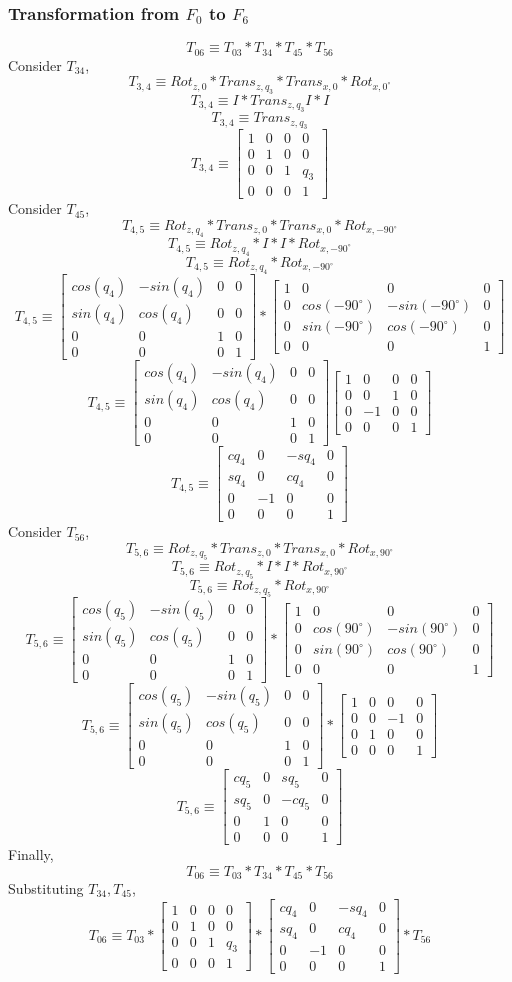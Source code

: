 \documentclass[12pt]{article}
\newcommand{\rx}[1]{\begin{bmatrix} 1 & 0 & 0 & 0 \\ 0 & cos(#1) & -sin(#1) & 0 \\ 0 & sin(#1) & cos(#1) & 0 \\ 0 & 0 & 0 & 1 \end{bmatrix}}
\newcommand{\rz}[1]{\begin{bmatrix} cos(#1) & -sin(#1) & 0 & 0 \\ sin(#1) & cos(#1) & 0 & 0 \\ 0 & 0 & 1 & 0 \\ 0 & 0 & 0 & 1 \end{bmatrix}}
\newcommand{\trans}[3]{\begin{bmatrix} 1 & 0 & 0 & #1 \\ 0 & 1 & 0 & #2 \\ 0 & 0 & 1 & #3 \\ 0 & 0 & 0 & 1 \end{bmatrix}}
\begin{document}
\subsubsection*{Transformation from $F_0$ to $F_6$}
\[
  T_{06} \equiv
  T_{03}
  * T_{34}
  * T_{45}
  * T_{56}
\]
Consider $T_{34}$,
\[
  T_{3,4} \equiv Rot_{z, 0} * Trans_{z, q_3} * Trans_{x, 0} * Rot_{x, 0^{\circ}}
\]
\[
  T_{3,4} \equiv I * Trans_{z, q_3} I * I
\]
\[
  T_{3,4} \equiv Trans_{z, q_3}
\]
\[
  T_{3,4} \equiv \trans{0}{0}{q_3}
\]
Consider $T_{45}$,
\[
  T_{4,5} \equiv Rot_{z, q_4} * Trans_{z, 0} * Trans_{x, 0} * Rot_{x, -90^{\circ}}
\]
\[
  T_{4,5} \equiv Rot_{z, q_4} * I * I * Rot_{x, -90^{\circ}}
\]
\[
  T_{4,5} \equiv Rot_{z, q_4} * Rot_{x, -90^{\circ}}
\]
\[
  T_{4,5} \equiv \rz{q_4} * \rx{-90^{\circ}}
\]
\[
  T_{4,5} \equiv \rz{q_4}
  \begin{bmatrix} 1 & 0 & 0 & 0 \\ 0 & 0 & 1 & 0 \\ 0 & -1 & 0 & 0 \\ 0 & 0 & 0 & 1 \end{bmatrix}
\]
\[
  T_{4,5} \equiv
  \begin{bmatrix} cq_4 & 0 & -sq_4 & 0 \\ sq_4 & 0 & cq_4 & 0 \\ 0 & -1 & 0 & 0 \\ 0 & 0 & 0 & 1 \end{bmatrix}
\]
Consider $T_{56}$,
\[
  T_{5,6} \equiv Rot_{z, q_5} * Trans_{z, 0} * Trans_{x, 0} * Rot_{x, 90^{\circ}}
\]
\[
  T_{5,6} \equiv Rot_{z, q_5} * I * I * Rot_{x, 90^{\circ}}
\]
\[
  T_{5,6} \equiv Rot_{z, q_5} * Rot_{x, 90^{\circ}}
\]
\[
  T_{5,6} \equiv \rz{q_5} * \rx{90^{\circ}}
\]
\[
  T_{5,6} \equiv \rz{q_5} *
  \begin{bmatrix} 1 & 0 & 0 & 0 \\ 0 & 0 & -1 & 0 \\ 0 & 1 & 0 & 0 \\ 0 & 0 & 0 & 1 \end{bmatrix}
\]
\[
  T_{5,6} \equiv
  \begin{bmatrix} cq_5 & 0 & sq_5 & 0 \\ sq_5 & 0 & -cq_5 & 0 \\ 0 & 1 & 0 & 0 \\ 0 & 0 & 0 & 1 \end{bmatrix}
\]
Finally,
\[
  T_{06} \equiv
  T_{03}
  * T_{34}
  * T_{45}
  * T_{56}
\]
Substituting $T_{34}, T_{45}$,
\[
  T_{06} \equiv
  T_{03}
  * \trans{0}{0}{q_3}
  * \begin{bmatrix} cq_4 & 0 & -sq_4 & 0 \\ sq_4 & 0 & cq_4 & 0 \\ 0 & -1 & 0 & 0 \\ 0 & 0 & 0 & 1 \end{bmatrix}
  * T_{56}
\]
\end{document}

